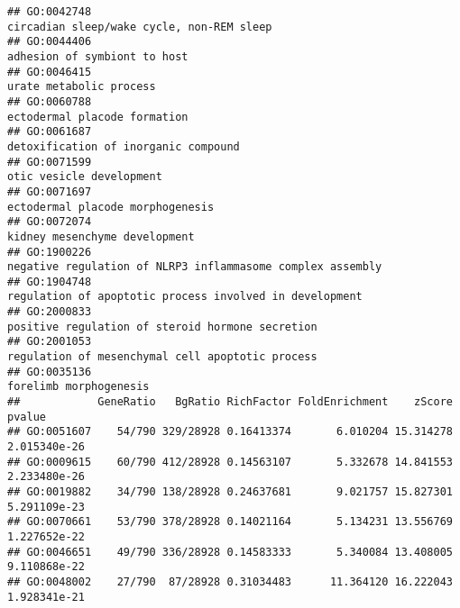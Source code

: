 \documentclass[
]{article}
\begin{document}
\begin{verbatim}
## GO:0042748                                                                                                        circadian sleep/wake cycle, non-REM sleep
## GO:0044406                                                                                                                     adhesion of symbiont to host
## GO:0046415                                                                                                                          urate metabolic process
## GO:0060788                                                                                                                     ectodermal placode formation
## GO:0061687                                                                                                             detoxification of inorganic compound
## GO:0071599                                                                                                                         otic vesicle development
## GO:0071697                                                                                                                 ectodermal placode morphogenesis
## GO:0072074                                                                                                                    kidney mesenchyme development
## GO:1900226                                                                                       negative regulation of NLRP3 inflammasome complex assembly
## GO:1904748                                                                                          regulation of apoptotic process involved in development
## GO:2000833                                                                                                 positive regulation of steroid hormone secretion
## GO:2001053                                                                                                 regulation of mesenchymal cell apoptotic process
## GO:0035136                                                                                                                           forelimb morphogenesis
##            GeneRatio   BgRatio RichFactor FoldEnrichment    zScore       pvalue
## GO:0051607    54/790 329/28928 0.16413374       6.010204 15.314278 2.015340e-26
## GO:0009615    60/790 412/28928 0.14563107       5.332678 14.841553 2.233480e-26
## GO:0019882    34/790 138/28928 0.24637681       9.021757 15.827301 5.291109e-23
## GO:0070661    53/790 378/28928 0.14021164       5.134231 13.556769 1.227652e-22
## GO:0046651    49/790 336/28928 0.14583333       5.340084 13.408005 9.110868e-22
## GO:0048002    27/790  87/28928 0.31034483      11.364120 16.222043 1.928341e-21

\end{verbatim}
\end{document}
